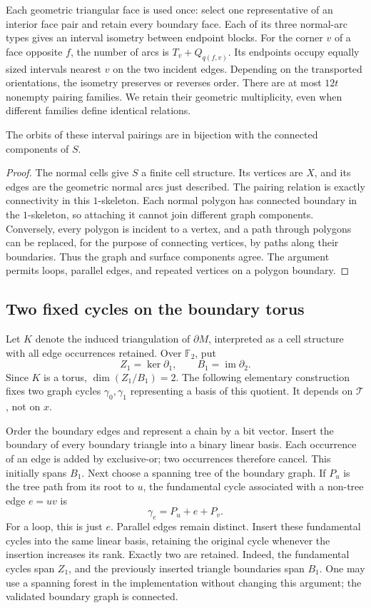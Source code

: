 Each geometric triangular face is used once: select one representative
of an interior face pair and retain every boundary face.  Each of its
three normal-arc types gives an interval isometry between endpoint
blocks.  For the corner $v$ of a face opposite $f$, the number of arcs
is $T_v+Q_{q(f,v)}$.  Its endpoints occupy equally sized intervals
nearest $v$ on the two incident edges.  Depending on the transported
orientations, the isometry preserves or reverses order.  There are at
most $12t$ nonempty pairing families.  We retain their geometric
multiplicity, even when different families define identical relations.

\begin{lemma}\label{nc:orbit-components}
The orbits of these interval pairings are in bijection with the
connected components of $S$.
\end{lemma}
\begin{proof}
The normal cells give $S$ a finite cell structure.  Its vertices are
$X$, and its edges are the geometric normal arcs just described.
The pairing relation is exactly connectivity in this $1$-skeleton.
Each normal polygon has connected boundary in the $1$-skeleton, so
attaching it cannot join different graph components.  Conversely,
every polygon is incident to a vertex, and a path through polygons
can be replaced, for the purpose of connecting vertices, by paths
along their boundaries.  Thus the graph and surface components agree.
The argument permits loops, parallel edges, and repeated vertices on
a polygon boundary.
\end{proof}

\subsection{Two fixed cycles on the boundary torus}
\label{nc:boundary-basis}

Let $K$ denote the induced triangulation of $\partial M$, interpreted
as a cell structure with all edge occurrences retained.  Over
$\mathbb F_2$, put
\[
 Z_1=\ker\partial_1,\qquad B_1=\operatorname{im}\partial_2.
\]
Since $K$ is a torus, $\dim(Z_1/B_1)=2$.  The following elementary
construction fixes two graph cycles $\gamma_0,\gamma_1$ representing
a basis of this quotient.  It depends on $\mathcal T$, not on $x$.

Order the boundary edges and represent a chain by a bit vector.
Insert the boundary of every boundary triangle into a binary linear
basis.  Each occurrence of an edge is added by exclusive-or; two
occurrences therefore cancel.  This initially spans $B_1$.  Next
choose a spanning tree of the boundary graph.  If $P_u$ is the tree
path from its root to $u$, the fundamental cycle associated with a
non-tree edge $e=uv$ is
\[
 \gamma_e=P_u+e+P_v.
\]
For a loop, this is just $e$.  Parallel edges remain distinct.
Insert these fundamental cycles into the same linear basis, retaining
the original cycle whenever the insertion increases its rank.  Exactly
two are retained.  Indeed, the fundamental cycles span $Z_1$, and
the previously inserted triangle boundaries span $B_1$.  One may
use a spanning forest in the implementation without changing this
argument; the validated boundary graph is connected.

